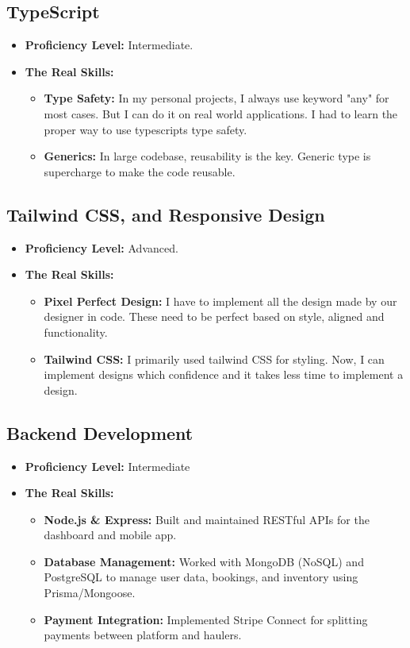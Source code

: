 \subsection{TypeScript}
\begin{itemize}
    \item \textbf{Proficiency Level:} Intermediate.
    \item \textbf{The Real Skills:}
    \begin{itemize}
        \item \textbf{Type Safety:} In my personal projects, I always use keyword "any" for most cases. But I can do it on real world applications. I had to learn the proper way to use typescripts type safety.
        \item \textbf{Generics:} In large codebase, reusability is the key. Generic type is supercharge to make the code reusable.
    \end{itemize}
\end{itemize}

\subsection{Tailwind CSS, and Responsive Design \cite{tailwindcss2024}}
\begin{itemize}
    \item \textbf{Proficiency Level:} Advanced.
    \item \textbf{The Real Skills:}
    \begin{itemize}
        \item \textbf{Pixel Perfect Design:} I have to implement all the design made by our designer in code. These need to be perfect based on style, aligned and functionality.
        \item \textbf{Tailwind CSS:} I primarily used tailwind CSS for styling. Now, I can implement designs which confidence and it takes less time to implement a design.
    \end{itemize}
\end{itemize}

\subsection{Backend Development}
\begin{itemize}
    \item \textbf{Proficiency Level:} Intermediate
    \item \textbf{The Real Skills:}
    \begin{itemize}
        \item \textbf{Node.js \& Express:} Built and maintained RESTful APIs for the dashboard and mobile app.
        \item \textbf{Database Management:} Worked with MongoDB (NoSQL) and PostgreSQL to manage user data, bookings, and inventory using Prisma/Mongoose.
        \item \textbf{Payment Integration:} Implemented Stripe Connect for splitting payments between platform and haulers.
    \end{itemize}
\end{itemize}

